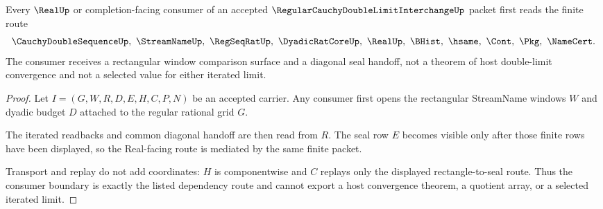 \begin{theorem}
\label{thm:regular-cauchy-double-limit-interchange-consumer-boundary}
Every $\RealUp$ or completion-facing consumer of an accepted $\RegularCauchyDoubleLimitInterchangeUp$ packet first reads the finite route
$$
\CauchyDoubleSequenceUp,\ \StreamNameUp,\ \RegSeqRatUp,\ \DyadicRatCoreUp,\ \RealUp,\ \BHist,\ \hsame,\ \Cont,\ \Pkg,\ \NameCert .
$$
The consumer receives a rectangular window comparison surface and a diagonal seal handoff, not a theorem of host double-limit convergence and not a selected value for either iterated limit.
\end{theorem}
\begin{proof}
Let $I=(G,W,R,D,E,H,C,P,N)$ be an accepted carrier. Any consumer first opens the rectangular StreamName windows $W$ and dyadic budget $D$ attached to the regular rational grid $G$.

The iterated readbacks and common diagonal handoff are then read from $R$. The seal row $E$ becomes visible only after those finite rows have been displayed, so the Real-facing route is mediated by the same finite packet.

Transport and replay do not add coordinates: $H$ is componentwise and $C$ replays only the displayed rectangle-to-seal route. Thus the consumer boundary is exactly the listed dependency route and cannot export a host convergence theorem, a quotient array, or a selected iterated limit.
\end{proof}




